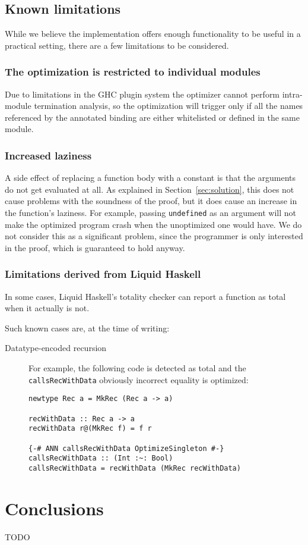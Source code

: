 \section{Known limitations}
\label{sec:limitations}

While we believe the implementation offers enough functionality to be useful in a practical setting, there are a few limitations to be considered.

\subsection{The optimization is restricted to individual modules}
\label{subsec:single-module}

Due to limitations in the GHC plugin system the optimizer cannot perform intra-module termination analysis, so the optimization will trigger only if all the names referenced by the annotated binding are either whitelisted or defined in the same module.

\subsection{Increased laziness}
\label{subsec:limitations-laziness}

A side effect of replacing a function body with a constant is that the arguments do not get evaluated at all.
As explained in Section~\ref{sec:solution}, this does not cause problems with the soundness of the proof, but it does cause an increase in the function's laziness.
For example, passing \texttt{undefined} as an argument will not make the optimized program crash when the unoptimized one would have.
We do not consider this as a significant problem, since the programmer is only interested in the proof, which is guaranteed to hold anyway.

\subsection{Limitations derived from Liquid Haskell}
\label{subsec:limitations-lh}

In some cases, Liquid Haskell's totality checker can report a function as total when it actually is not.

Such known cases are, at the time of writing:

\begin{description}
  \item[Datatype-encoded recursion]
    For example, the following code is detected as total and the \texttt{callsRecWithData} obviously incorrect equality is optimized:
    \begin{lstlisting}
newtype Rec a = MkRec (Rec a -> a)

recWithData :: Rec a -> a
recWithData r@(MkRec f) = f r

{-# ANN callsRecWithData OptimizeSingleton #-}
callsRecWithData :: (Int :~: Bool)
callsRecWithData = recWithData (MkRec recWithData)
    \end{lstlisting}
\end{description}

\chapter{Conclusions}
\label{cha:conclusions}

TODO

